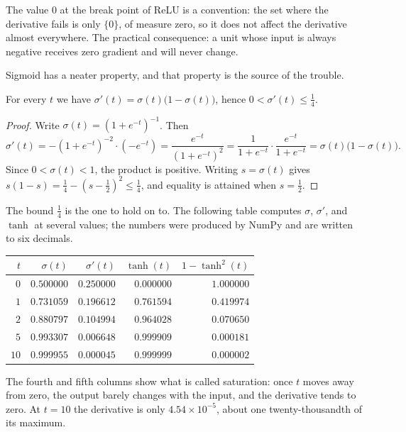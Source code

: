 The value $0$ at the break point of ReLU is a convention: the set where the derivative fails is
only $\{0\}$, of measure zero, so it does not affect the derivative almost everywhere. The
practical consequence: a unit whose input is always negative receives zero gradient and will
never change.

Sigmoid has a neater property, and that property is the source of the trouble.

\begin{lemma}
For every $t$ we have $\sigma'(t)=\sigma(t)\bigl(1-\sigma(t)\bigr)$, hence
$0<\sigma'(t)\le\tfrac14$.
\end{lemma}

\begin{proof}
Write $\sigma(t)=(1+e^{-t})^{-1}$. Then
\[
  \sigma'(t)=-(1+e^{-t})^{-2}\cdot(-e^{-t})
  =\frac{e^{-t}}{(1+e^{-t})^{2}}
  =\frac{1}{1+e^{-t}}\cdot\frac{e^{-t}}{1+e^{-t}}
  =\sigma(t)\bigl(1-\sigma(t)\bigr).
\]
Since $0<\sigma(t)<1$, the product is positive. Writing $s=\sigma(t)$ gives
$s(1-s)=\tfrac14-(s-\tfrac12)^{2}\le\tfrac14$, and equality is attained when $s=\tfrac12$.
\end{proof}

The bound $\tfrac14$ is the one to hold on to. The following table computes $\sigma$,
$\sigma'$, and $\tanh$ at several values; the numbers were produced by NumPy and are written to
six decimals.

\begin{center}
\small
\begin{tabular}{rrrrr}
\hline
$t$ & $\sigma(t)$ & $\sigma'(t)$ & $\tanh(t)$ & $1-\tanh^{2}(t)$ \\
\hline
$0$  & $0.500000$ & $0.250000$ & $0.000000$ & $1.000000$ \\
$1$  & $0.731059$ & $0.196612$ & $0.761594$ & $0.419974$ \\
$2$  & $0.880797$ & $0.104994$ & $0.964028$ & $0.070650$ \\
$5$  & $0.993307$ & $0.006648$ & $0.999909$ & $0.000181$ \\
$10$ & $0.999955$ & $0.000045$ & $0.999999$ & $0.000002$ \\
\hline
\end{tabular}
\end{center}

The fourth and fifth columns show what is called saturation: once $t$ moves away from zero, the
output barely changes with the input, and the derivative tends to zero. At $t=10$ the derivative
is only $4.54\times10^{-5}$, about one twenty-thousandth of its maximum.

